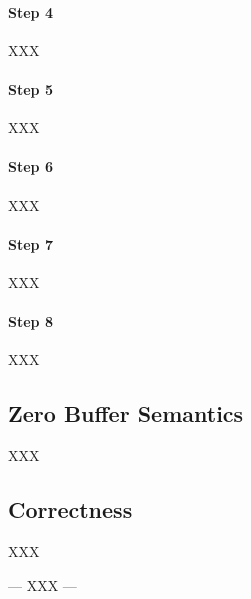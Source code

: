 \paragraph{Step 4} XXX
\paragraph{Step 5} XXX
\paragraph{Step 6} XXX
\paragraph{Step 7} XXX
\paragraph{Step 8} XXX

\subsection{Zero Buffer Semantics}

XXX

\subsection{Correctness}

XXX

--- XXX ---


